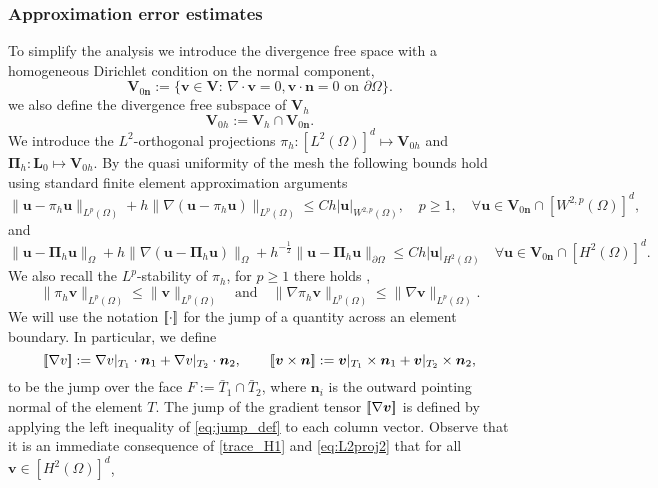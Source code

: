 \documentclass[10pt]{amsart}
\numberwithin{equation}{section}
\theoremstyle{definition}
\theoremstyle{remark}
\renewcommand{\(}{\bigl(}
\renewcommand{\)}{\bigr)}
\newcommand{\jump}[1]{\left[\hspace{-0.025in}\left[#1\right]\hspace{-0.025in}\right]}
\newcommand{\bld}[1]{\boldsymbol{#1}}
\newcommand{\bv}{\bld{v}}
\newcommand{\bn}{\bld{n}}
\newcommand{\bu}{\bld{u}}
\newcommand{\bV}{\bld{V}}
\newcommand{\bPi}{\bld{\Pi}}
\newcommand{\bL}{\bld{L}}
\begin{document}
\subsubsection{Approximation error estimates}
To simplify the analysis we introduce the divergence free space
with a homogeneous Dirichlet condition on the normal component,
\[
\bV_{0\bn} := \{\bv \in \bV:\, \nabla \cdot \bv = 0, \bv \cdot \bn =0
\mbox{ on } \partial \Omega \}.
\]
we also define the divergence free subspace of $\bV_h$
\[
\bV_{0h} := \bV_h \cap \bV_{0\bn}.
\]
We introduce the $L^2$-orthogonal projections $\pi_h:[L^2(\Omega)]^d\mapsto \bV_{0h}$
and $\bPi_h: \bL_0 \mapsto \bV_{0h}$. By the quasi
uniformity of the mesh the following bounds hold using standard finite element
approximation arguments
\begin{equation}\label{eq:L2proj1}
\|\bu - \pi_h \bu\|_{L^p(\Omega)} + h \|\nabla (\bu - \pi_h \bu)\|_{L^p(\Omega)}
\leq C h |\bu|_{W^{2,p}(\Omega)}, \quad p \ge 1, \quad \forall \bu \in
\bV_{0\bn} \cap [W^{2,p}(\Omega)]^d,
\end{equation}
and
\begin{equation}\label{eq:L2proj2}
\|\bu - \bPi_h \bu\|_\Omega + h \|\nabla (\bu - \bPi_h \bu)\|_\Omega+
h^{-\frac12} \|\bu - \bPi_h \bu\|_{\partial \Omega}
\leq C h |\bu|_{H^2(\Omega)}\quad \forall \bu \in \bV_{0\bn} \cap [H^2(\Omega)]^d.
\end{equation}
We also recall the $L^p$-stability of $\pi_h$, for $p \ge 1$ there
holds \cite{CT87},
\begin{equation}\label{eq:Lpstab}
\|\pi_h \bv\|_{L^p(\Omega)} \leq \| \bv\|_{L^p(\Omega)}  \quad \mbox{and
}  \quad \|\nabla \pi_h \bv\|_{L^p(\Omega)} \leq \|\nabla \bv\|_{L^p(\Omega)}.
\end{equation}
We will use the notation $\jump{\cdot}$ for the jump of a quantity
across an element boundary. In particular, we define
\begin{equation}\label{eq:jump_def}
\jump{\nabla v }:=\nabla v\vert_{T_1} \cdot\bn_1 + \nabla
v\vert_{T_2} \cdot \bn_2,\qquad  \jump{\bv \times \bn} := \bv\vert_{T_1} \times \bn_1 + \bv\vert_{T_2} \times \bn_2,
\end{equation}
to be the jump over the face $F:= \bar T_1 \cap \bar T_2$, where
$\bn_i$ is the outward pointing normal of the element $T$. The jump of
the gradient tensor $\jump{\nabla \bv }$ is defined by
applying the left inequality of \eqref{eq:jump_def} to each column vector. Observe
that it is an immediate consequence of \eqref{trace_H1} and
\eqref{eq:L2proj2} that for all $\bv \in [H^2(\Omega)]^d$,
\end{document}
